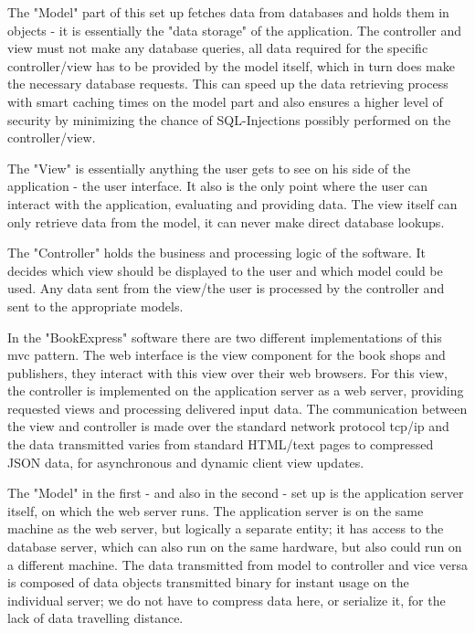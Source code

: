 \documentclass[11pt,a4paper,oneside,svgnames]{report}
\begin{document}
The "Model" part of this set up fetches data from databases and holds them in objects - it is essentially the "data storage" of the application. The controller and view must not make any database queries, all data required for the specific controller/view has to be provided by the model itself, which in turn does make the necessary database requests. This can speed up the data retrieving process with smart caching times on the model part and also ensures a higher level of security by minimizing the chance of SQL-Injections possibly performed on the controller/view.

The "View" is essentially anything the user gets to see on his side of the application - the user interface. It also is the only point where the user can interact with the application, evaluating and providing data. The view itself can only retrieve data from the model, it can never make direct database lookups.

The "Controller" holds the business and processing logic of the software. It decides which view should be displayed to the user and which model could be used. Any data sent from the view/the user is processed by the controller and sent to the appropriate models.

In the "BookExpress" software there are two different implementations of this \gls{mvc} pattern. The web interface is the view component for the book shops and publishers, they interact with this view over their web browsers.
For this view, the controller is implemented on the application server as a web server, providing requested views and processing delivered input data. The communication between the view and controller is made over the standard network protocol tcp/ip and the data transmitted varies from standard HTML/text pages to compressed JSON data, for asynchronous and dynamic client view updates.

The "Model" in the first - and also in the second - set up is the application server itself, on which the web server runs. The application server is on the same machine as the web server, but logically a separate entity; it has access to the database server, which can also run on the same hardware, but also could run on a different machine. The data transmitted from model to controller and vice versa is composed of data objects transmitted binary for instant usage on the individual server; we do not have to compress data here, or serialize it, for the lack of data travelling distance.
\end{document}
